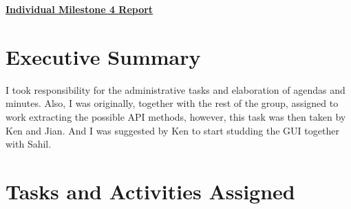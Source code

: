 \documentclass{article}
\begin{document}
\pagestyle{headings}

\begin{center}
{\LARGE\textbf{\underline{{Individual Milestone 4 Report}}}}
\end{center}

\section*{Executive Summary}

I took responsibility for the administrative tasks and elaboration of agendas and minutes.  Also, I was originally, together with the rest of the group, assigned to work extracting the possible API methods, however, this task was then taken by Ken and Jian.  And I was suggested by Ken to start studding the GUI together with Sahil.

\section*{Tasks and Activities Assigned}
\end{document}
